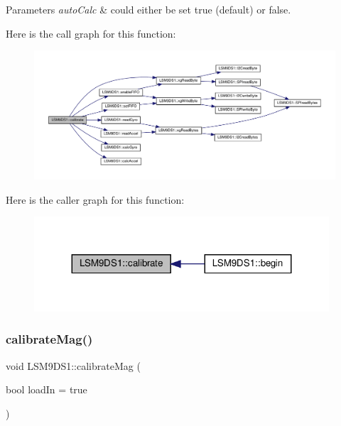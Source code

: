 \begin{DoxyParams}{Parameters}
{\em auto\+Calc} & could either be set true (default) or false. \\
\hline
\end{DoxyParams}
Here is the call graph for this function\+:
\nopagebreak
\begin{figure}[H]
\begin{center}
\leavevmode
\includegraphics[width=350pt]{classLSM9DS1_a97939cb15fcb7e33abcd6d3a9230d943_cgraph}
\end{center}
\end{figure}
Here is the caller graph for this function\+:
\nopagebreak
\begin{figure}[H]
\begin{center}
\leavevmode
\includegraphics[width=311pt]{classLSM9DS1_a97939cb15fcb7e33abcd6d3a9230d943_icgraph}
\end{center}
\end{figure}
\mbox{\label{classLSM9DS1_afb45f0bcbcbeb15d4bd1a28821b24d14}} 
\subsubsection{\texorpdfstring{calibrate\+Mag()}{calibrateMag()}}
{\footnotesize\ttfamily void L\+S\+M9\+D\+S1\+::calibrate\+Mag (\begin{DoxyParamCaption}\item[{bool}]{load\+In = {\ttfamily true} }\end{DoxyParamCaption})}




